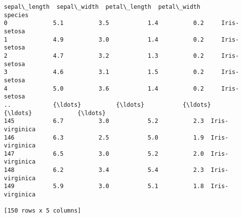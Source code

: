 \documentclass[11pt]{article}
\makeatletter
\newcommand{\boxspacing}{\kern\kvtcb@left@rule\kern\kvtcb@boxsep}
\newcommand{\prompt}[4]{
        \ttfamily\llap{{\color{#2}[#3]:\hspace{3pt}#4}}\vspace{-\baselineskip}
    }
\makeatother
\begin{document}
            \begin{tcolorbox}[breakable, size=fbox, boxrule=.5pt, pad at break*=1mm, opacityfill=0]
\prompt{Out}{outcolor}{16}{\boxspacing}
\begin{Verbatim}[commandchars=\\\{\}]
     sepal\_length  sepal\_width  petal\_length  petal\_width         species
0             5.1          3.5           1.4          0.2     Iris-setosa
1             4.9          3.0           1.4          0.2     Iris-setosa
2             4.7          3.2           1.3          0.2     Iris-setosa
3             4.6          3.1           1.5          0.2     Iris-setosa
4             5.0          3.6           1.4          0.2     Iris-setosa
..            {\ldots}          {\ldots}           {\ldots}          {\ldots}             {\ldots}
145           6.7          3.0           5.2          2.3  Iris-virginica
146           6.3          2.5           5.0          1.9  Iris-virginica
147           6.5          3.0           5.2          2.0  Iris-virginica
148           6.2          3.4           5.4          2.3  Iris-virginica
149           5.9          3.0           5.1          1.8  Iris-virginica

[150 rows x 5 columns]
\end{Verbatim}
\end{tcolorbox}
        
\end{document}
